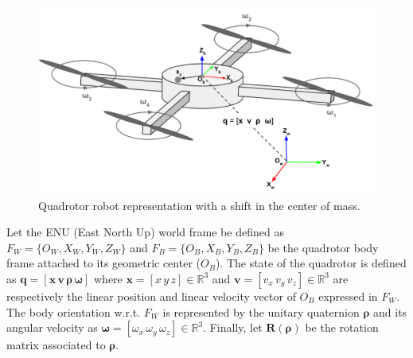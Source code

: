 \begin{figure} [t]
    \centering
    \includegraphics[width=0.8\linewidth]{figures/models/drone.png} 
    \caption{Quadrotor robot representation with a shift in the center of mass.}%
    \label{fig:quad}%
\end{figure}

Let the ENU (East North Up) world frame be defined as $F_W \allowbreak = \allowbreak \{O_W, \allowbreak X_W, \allowbreak Y_W, \allowbreak Z_W\}$ and $F_B = \allowbreak\{O_B, \allowbreak X_B, \allowbreak Y_B, \allowbreak Z_B\}$ be the quadrotor body frame attached to its geometric center ($O_B$).
The state of the quadrotor is defined as $\boldsymbol{q} = [\boldsymbol{x}  \, \boldsymbol{v} \, \boldsymbol{\rho} \, \boldsymbol{\omega}]$ where $\boldsymbol{x} = [x \, y \,z] \in \mathbb{R}^{3}$ and $\boldsymbol{v} = [v_x \, v_y \,v_z] \in \mathbb{R}^{3}$ are respectively the linear position and linear velocity vector of $O_B$ expressed in $F_W$. The body orientation w.r.t. $F_W$ is represented by the unitary quaternion  $\boldsymbol{\rho}$ and its angular velocity as $\boldsymbol{\omega} = [\omega_x \, \omega_y \, \omega_z] \in \mathbb{R}^{3}$. 
Finally, let $\boldsymbol{R(\rho)}$ be the rotation matrix associated to $\boldsymbol{\rho}$.

